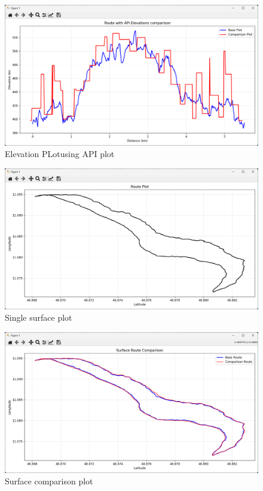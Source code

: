 \documentclass[12pt]{article}
\begin{document}
\begin{figure}[h!]
    \centering
    \includegraphics[width=\textwidth]{Project_Screenshots/5ElevationPLotusingAPIplot.png}
    \caption{Elevation PLotusing API plot}
\end{figure}

\begin{figure}[h!]
    \centering
    \includegraphics[width=\textwidth]{Project_Screenshots/7SingleSurfacePlot.png}
    \caption{Single surface plot}
\end{figure}

\begin{figure}[h!]
    \centering
    \includegraphics[width=\textwidth]{Project_Screenshots/6SurfacePlotComparisonPlot.png}
    \caption{Surface comparison plot}
\end{figure}
\end{document}
